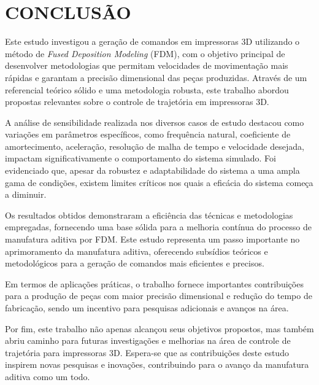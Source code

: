 \chapter{CONCLUSÃO}
Este estudo investigou a geração de comandos em impressoras 3D utilizando o método de \textit{Fused Deposition Modeling} (FDM), com o objetivo principal de desenvolver metodologias que permitam velocidades de movimentação mais rápidas e garantam a precisão dimensional das peças produzidas. Através de um referencial teórico sólido e uma metodologia robusta, este trabalho abordou propostas relevantes sobre o controle de trajetória em impressoras 3D.

A análise de sensibilidade realizada nos diversos casos de estudo destacou como variações em parâmetros específicos, como frequência natural, coeficiente de amortecimento, aceleração, resolução de malha de tempo e velocidade desejada, impactam significativamente o comportamento do sistema simulado. Foi evidenciado que, apesar da robustez e adaptabilidade do sistema a uma ampla gama de condições, existem limites críticos nos quais a eficácia do sistema começa a diminuir. 

Os resultados obtidos demonstraram a eficiência das técnicas e metodologias empregadas, fornecendo uma base sólida para a melhoria contínua do processo de manufatura aditiva por FDM. Este estudo representa um passo importante no aprimoramento da manufatura aditiva, oferecendo subsídios teóricos e metodológicos para a geração de comandos mais eficientes e precisos.

Em termos de aplicações práticas, o trabalho fornece importantes contribuições para a produção de peças com maior precisão dimensional e redução do tempo de fabricação, sendo um incentivo para pesquisas adicionais e avanços na área.

Por fim, este trabalho não apenas alcançou seus objetivos propostos, mas também abriu caminho para futuras investigações e melhorias na área de controle de trajetória para impressoras 3D. Espera-se que as contribuições deste estudo inspirem novas pesquisas e inovações, contribuindo para o avanço da manufatura aditiva como um todo.
